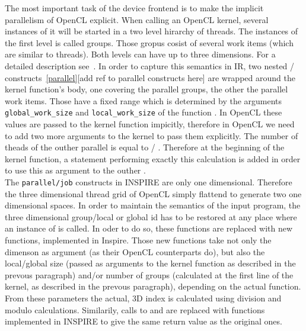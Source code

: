 The most important task of the device frontend is to make the implicit parallelism of OpenCL explicit. When calling an OpenCL kernel, several instances of it will be started in a two level hirarchy of threads. The instances of the first level is called groups. Those gropus cosist of several work items (which are similar to threads). Both levels can have up to three dimensions. For a detailed description see~\cite{oclRef}. In order to capture this semantics in IR, two nested / constructs~\ref{parallel}[add ref to parallel constructs here] are wrapped around the kernel function's body, one covering the parallel groups, the other the parallel work items. Those  have a fixed range which is determined by the arguments \texttt{global\_work\_size} and \texttt{local\_work\_size} of the function . In OpenCL these values are passed to the kernel function impicitly, therefore in OpenCL we need to add two more arguments to the kernel to pass them explicitly. The number of theads of the outher parallel is equal to  / . Therefore at the beginning of the kernel function, a statement performing exactly this calculation is added in order to use this as argument to the outher . \\

The \texttt{parallel/job} constructs in INSPIRE are only one dimensional. Therefore the three dimensional thread grid of OpenCL simply flattend to generate two one dimensional spaces. In order to maintain the semantics of the input program, the three dimensional group/local or global id has to be restored at any place where an instance of  is called. In oder to do so, these functions are replaced with new functions, implemented in Inspire. Those new functions take not only the dimenson as argument (as their OpenCL counterparts do), but also the local/global size (passed as arguments to the kernel function as described in the prevous paragraph) and/or number of groups (calculated at the first line of the kernel, as described in the prevous paragraph), depending on the actual function. From these parameters the actual, 3D index is calculated using division and modulo calculations. Similarily, calls to  and  are replaced with functions implemented in INSPIRE to give the same return value as the original ones. \\

